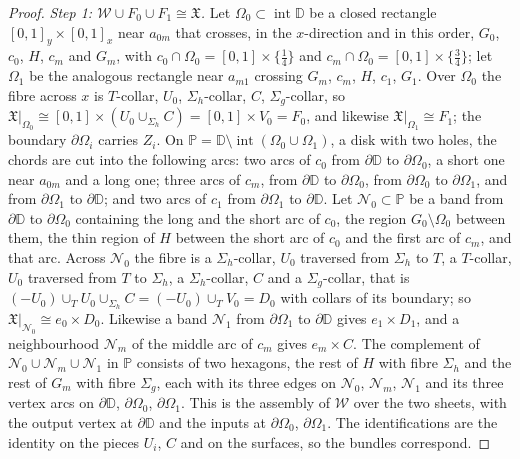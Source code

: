 \documentclass[11pt]{amsart}
\theoremstyle{definition}
\theoremstyle{remark}
\theoremstyle{plain}
\numberwithin{equation}{section}
\begin{document}
\begin{proof}
\emph{Step 1: $\mathscr W\cup F_0\cup F_1\cong\mathfrak X$.} Let $\Omega_0\subset\operatorname{int}\mathbb D$ be a
closed rectangle $[0,1]_y\times[0,1]_x$ near $a_{0m}$ that crosses, in the $x$-direction and
in this order, $G_0$, $c_0$, $H$, $c_m$ and $G_m$, with $c_0\cap\Omega_0=[0,1]\times\{\tfrac14\}$
and $c_m\cap\Omega_0=[0,1]\times\{\tfrac34\}$; let $\Omega_1$ be the analogous rectangle near $a_{m1}$
crossing $G_m$, $c_m$, $H$, $c_1$, $G_1$. Over $\Omega_0$ the fibre across $x$ is
$T$-collar, $U_0$, $\Sigma_h$-collar, $C$, $\Sigma_g$-collar, so
$\mathfrak X|_{\Omega_0}\cong[0,1]\times(U_0\cup_{\Sigma_h}C)=[0,1]\times V_0=F_0$, and likewise
$\mathfrak X|_{\Omega_1}\cong F_1$; the boundary $\partial\Omega_i$ carries $Z_i$. On
$\mathbb P=\mathbb D\setminus\operatorname{int}(\Omega_0\cup\Omega_1)$, a disk with two holes, the chords are cut
into the following arcs: two arcs of $c_0$ from $\partial\mathbb D$ to $\partial\Omega_0$, a short one near
$a_{0m}$ and a long one; three arcs of $c_m$, from $\partial\mathbb D$ to $\partial\Omega_0$, from $\partial\Omega_0$ to
$\partial\Omega_1$, and from $\partial\Omega_1$ to $\partial\mathbb D$; and two arcs of $c_1$ from $\partial\Omega_1$ to $\partial\mathbb D$.
Let $\mathcal N_0\subset\mathbb P$ be a band from $\partial\mathbb D$ to $\partial\Omega_0$ containing the long and the short
arc of $c_0$, the region $G_0\setminus\Omega_0$ between them, the thin region of $H$ between
the short arc of $c_0$ and the first arc of $c_m$, and that arc. Across $\mathcal N_0$ the fibre
is a $\Sigma_h$-collar, $U_0$ traversed from $\Sigma_h$ to $T$, a $T$-collar, $U_0$ traversed from
$T$ to $\Sigma_h$, a $\Sigma_h$-collar, $C$ and a $\Sigma_g$-collar, that is
$(-U_0)\cup_TU_0\cup_{\Sigma_h}C=(-U_0)\cup_TV_0=D_0$ with collars of its boundary; so
$\mathfrak X|_{\mathcal N_0}\cong e_0\times D_0$. Likewise a band $\mathcal N_1$ from $\partial\Omega_1$ to $\partial\mathbb D$ gives
$e_1\times D_1$, and a neighbourhood $\mathcal N_m$ of the middle arc of $c_m$ gives $e_m\times C$. The
complement of $\mathcal N_0\cup \mathcal N_m\cup \mathcal N_1$ in $\mathbb P$ consists of two hexagons, the rest of $H$
with fibre $\Sigma_h$ and the rest of $G_m$ with fibre $\Sigma_g$, each with its three edges on
$\mathcal N_0$, $\mathcal N_m$, $\mathcal N_1$ and its three vertex arcs on $\partial\mathbb D$, $\partial\Omega_0$, $\partial\Omega_1$. This is the
assembly of $\mathscr W$ over the two sheets, with the output vertex at $\partial\mathbb D$ and the
inputs at $\partial\Omega_0$, $\partial\Omega_1$. The identifications are the identity on the pieces
$U_i$, $C$ and on the surfaces, so the bundles correspond.


\end{proof}
\end{document}
